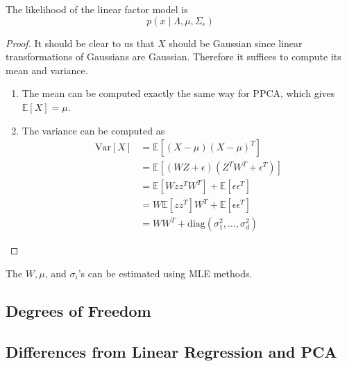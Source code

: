   \begin{lemma}
    The likelihood of the linear factor model is 
    \begin{equation}
      p(x \mid \Lambda, \mu, \Sigma_\epsilon) 
    \end{equation}
  \end{lemma}
  \begin{proof}
    It should be clear to us that $X$ should be Gaussian since linear transformations of Gaussians are Gaussian. Therefore it suffices to compute its mean and variance. 
    \begin{enumerate}
      \item The mean can be computed exactly the same way for PPCA, which gives $\mathbb{E}[X] = \mu$. 
      \item The variance can be computed as 
      \begin{align} 
        \mathrm{Var}[X] & = \mathbb{E}[ (X - \mu)(X - \mu)^T ] \\
                        & = \mathbb{E}[ (W Z + \epsilon) (Z^T W^T + \epsilon^T)] \\
                        & = \mathbb{E}[W z z^T W^T] + \mathbb{E}[ \epsilon \epsilon^T] \\
                        & = W \mathbb{E}[ z z^T] W^T + \mathbb{E}[ \epsilon \epsilon^T] \\
                        & = W W^T + \mathrm{diag}(\sigma_1^2, \ldots, \sigma_d^2) 
      \end{align} 
    \end{enumerate}
  \end{proof}

  The $W, \mu$, and $\sigma_i$'s can be estimated using MLE methods. 

  \begin{theorem}
    
  \end{theorem}

\subsection{Degrees of Freedom}

  
\subsection{Differences from Linear Regression and PCA} 

  
